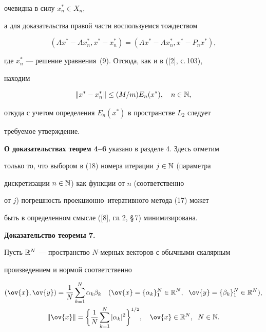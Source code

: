 очевидна в силу $x_n^*\in X_n$,


а для доказательства правой части воспользуемся тождеством


$$


(Ax^*-Ax_n^*,x^*-x_n^*)=(Ax^*-Ax_n^*,x^*-P_nx^*),


$$


где $x_n^*$ --- решение уравнения~(9). Отсюда, как и в ([2], с.\,103),


находим


$$


\|x^*-x_n^*\|\leq (M/m) E_n(x^*),\quad n\in \Bbb N,


$$


откуда с учетом определения $E_n(x^*)$ в пространстве $L_2$ следует


требуемое утверждение.





{\bf О доказательствах теорем 4--6} указано в разделе 4. Здесь отметим


только то, что выбором в (18) номера итерации $j\in \Bbb N$ (параметра


дискретизации $n\in \Bbb N$) как функции от $n$ (соответственно


от $j$) погрешность проекционно--итеративного метода (17) может


быть в определенном смысле ([8], гл.\,2, \S\,7) минимизирована.


\medskip





{\bf Доказательство теоремы 7.}


Пусть $\Bbb R^N$ --- пространство $N$-мерных векторов с обычными скалярным


произведением и нормой соответственно


\begin{gather*}


(\ov{x},\ov{y})=\frac{1}{N}\sum_{k=1}^N\alpha_k\beta_k\quad


(\ov{x}=\{\alpha_k\}_1^N\in \Bbb R^N,\ \;


\ov{y}=\{\beta_k\}_1^N\in \Bbb R^N), \\


\|\ov{x}\|=\biggl\{ \frac{1}{N}\sum_{k=1}^N|\alpha_k|^2\biggr\}^{1/2},


\quad \ov{x}\in \Bbb R^N,\ \; N\in \Bbb N.


\end{gather*}


